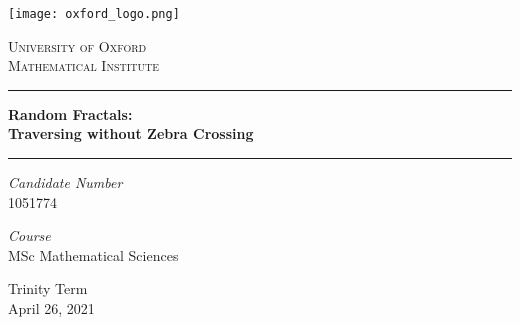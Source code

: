 \begin{titlepage}
	\newcommand{\HRule}{\rule{\linewidth}{0.5mm}}
		\begin{center}
		\texttt{[image: oxford\_logo.png]}
		\vspace*{1cm}
		
		\textsc{\LARGE University of Oxford}\\[0.75cm]
		\textsc{\LARGE Mathematical Institute}
		
		\vspace{1.5cm}
		
		\HRule

		\vspace{0.5cm}

		\textbf{\huge Random Fractals:\\}
		\vspace{0.3cm}
		\textbf{\huge Traversing without Zebra Crossing}
		
		\vspace{0.5cm}
		\HRule
		
		\vspace{1.5cm}
		
		\begin{minipage}{0.4\textwidth}
			\begin{flushleft}
				\large
			\end{flushleft}
		\end{minipage}
		
		\begin{minipage}{0.4\textwidth}
			\begin{flushright}
				\large
			\end{flushright}
		\end{minipage}
		
		\vspace{0.5cm}
		
		\textit{Candidate Number}\\
		1051774
		
		\vspace{0.5cm}
		
		\textit{Course}\\
		MSc Mathematical Sciences
		
		\vfill
		
		{\large Trinity Term\\
			April 26, 2021}
	\end{center}
\end{titlepage}
